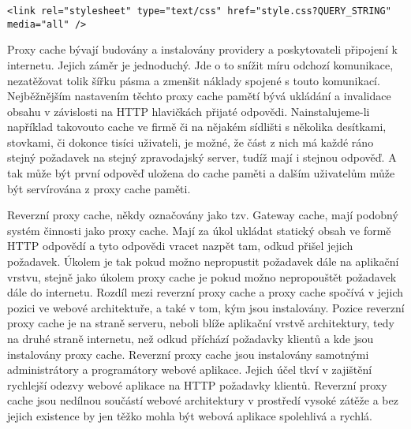 \documentclass[12pt]{article}
\begin{document}
\begin{scriptsize}
\begin{verbatim}
<link rel="stylesheet" type="text/css" href="style.css?QUERY_STRING" media="all" />
\end{verbatim}
\end{scriptsize}

Proxy cache bývají budovány a instalovány providery a poskytovateli připojení k internetu. Jejich záměr je jednoduchý. Jde o to snížit míru odchozí komunikace, nezatěžovat tolik šířku pásma a zmenšit náklady spojené s touto komunikací. Nejběžnějším nastavením těchto proxy cache pamětí bývá ukládání a invalidace obsahu v závislosti na HTTP hlavičkách přijaté odpovědi. Nainstalujeme-li například takovouto cache ve firmě či na nějakém sídlišti s několika desítkami, stovkami, či dokonce tisíci uživateli, je možné, že část z nich má každé ráno stejný požadavek na stejný zpravodajský server, tudíž mají i stejnou odpověď. A tak může být první odpověď uložena do cache paměti a dalším uživatelům může být servírována z proxy cache paměti.\cite{proxy-cache}

\obrazek
{}

\label{sec:reverse-proxy}
Reverzní proxy cache, někdy označovány jako tzv. Gateway cache, mají podobný systém činnosti jako proxy cache. Mají za úkol ukládat statický obsah ve formě HTTP odpovědí a tyto odpovědi vracet nazpět tam, odkud přišel jejich požadavek. Úkolem je tak pokud možno nepropustit požadavek dále na aplikační vrstvu, stejně jako úkolem proxy cache je pokud možno nepropouštět požadavek dále do internetu. Rozdíl mezi reverzní proxy cache a proxy cache spočívá v jejich pozici ve webové architektuře, a také v tom, kým jsou instalovány. Pozice reverzní proxy cache je na straně serveru, neboli blíže aplikační vrstvě architektury, tedy na druhé straně internetu, než odkud příchází požadavky klientů a kde jsou instalovány proxy cache. Reverzní proxy cache jsou instalovány samotnými administrátory a programátory webové aplikace. Jejich účel tkví v zajištění rychlejší odezvy webové aplikace na HTTP požadavky klientů. Reverzní proxy cache jsou nedílnou součástí webové architektury v prostředí vysoké zátěže a bez jejich existence by jen těžko mohla být webová aplikace spolehlivá a rychlá.\cite{proxy-cache}

\obrazek
{}
\end{document}
